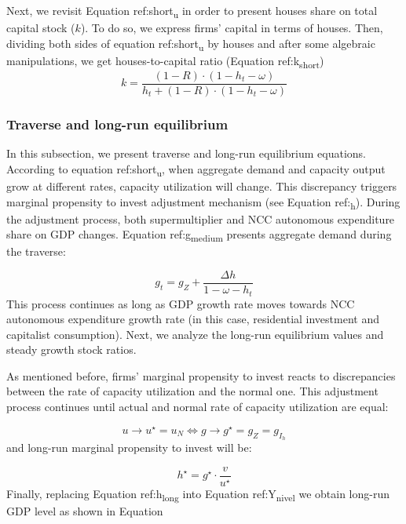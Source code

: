 \documentclass[12pt]{article}
\begin{document}
Next, we revisit Equation ref:short\textsubscript{u} in order to present houses share on total capital stock (\(k\)).
To do so, we express firms' capital in terms of houses. 
Then, dividing both sides of equation ref:short\textsubscript{u} by houses and after some algebraic manipulations, we get houses-to-capital ratio (Equation ref:k\textsubscript{short})
\begin{equation}
\label{k_short}
k = \frac{(1-R)\cdot (1-h_t - \omega)}{h_t + (1-R)\cdot (1-h_t - \omega)}
\end{equation}

\subsubsection{Traverse and long-run equilibrium}
\label{sec:orgde2e28f}
\label{long}

In this subsection, we present traverse and long-run equilibrium equations.
According to equation ref:short\textsubscript{u}, when aggregate demand and capacity output grow at different rates, capacity utilization will change. 
This discrepancy triggers marginal propensity to invest adjustment mechanism (see Equation ref:\textsubscript{h}). 
During the adjustment process, both supermultiplier and NCC autonomous expenditure share on GDP changes.
Equation ref:g\textsubscript{medium} presents aggregate demand during the traverse:

\begin{equation}
\label{g_medium}
g_t = g_{Z} + \frac{\Delta h}{1 - \omega - h_{t}}
\end{equation}
This process continues as long as GDP growth rate moves towards NCC autonomous expenditure growth rate (in this case, residential investment and capitalist consumption). Next, we analyze the long-run equilibrium values and steady growth stock ratios.

As mentioned before, firms’ marginal propensity to invest reacts to discrepancies between the rate of capacity utilization and the normal one.  This adjustment process continues until actual and normal rate of capacity utilization are equal:

$$
u \to u^{\star}  = u_N \Leftrightarrow g \to g^{\star} = g_Z = g_{I_{h}}
$$
and long-run marginal propensity to invest will be:


\begin{equation}
\label{h_long}
h^{\star} = g^{\star}\cdot \frac{v}{u^{\star}}
\end{equation}
Finally, replacing Equation ref:h\textsubscript{long} into Equation ref:Y\textsubscript{nivel} we obtain long-run GDP level as shown in Equation
\end{document}
